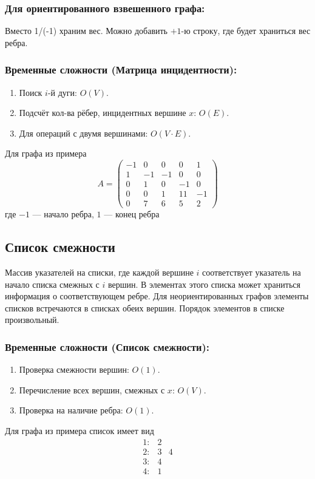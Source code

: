 \subsubsection*{Для ориентированного взвешенного графа:}
Вместо 1/(-1) храним вес. Можно добавить $+1$-ю строку, где будет храниться вес ребра.

\subsubsection*{Временные сложности (Матрица инцидентности):}
\begin{enumerate}
	\item Поиск $i$-й дуги: $O(V)$.
	\item Подсчёт кол-ва рёбер, инцидентных вершине $x$: $O(E)$.
	\item Для операций с двумя вершинами: $O(V \cdot E)$.
\end{enumerate}

Для графа из примера
\begin{equation*}
	A = 
	\begin{pmatrix}
		-1 & 0 & 0 & 0 & 1\\
		1 & -1 & -1 & 0 & 0\\
		0 & 1 & 0 & -1 & 0\\
		0 & 0 & 1 & 11 & -1\\
		0 & 7 & 6 & 5 & 2
	\end{pmatrix}	
\end{equation*}
где $-1$ --- начало ребра, $1$ --- конец ребра

\subsection{Список смежности}
Массив указателей на списки, где каждой вершине $i$ соответствует указатель на начало списка смежных с $i$ вершин. В элементах этого списка может храниться информация о соответствующем ребре.
Для неориентированных графов элементы списков встречаются в списках обеих вершин. Порядок элементов в списке произвольный.

\subsubsection*{Временные сложности (Список смежности):}
\begin{enumerate}
	\item Проверка смежности вершин: $O(1)$.
	\item Перечисление всех вершин, смежных с $x$: $O(V)$.
	\item Проверка на наличие ребра: $O(1)$.
\end{enumerate}
 Для графа из примера список имеет вид
\begin{equation*}
	\begin{matrix}
	1: &	2\\
	2: & 3 & 4\\
	3: & 4\\
	4: & 	1\\
	\end{matrix}	
\end{equation*}
